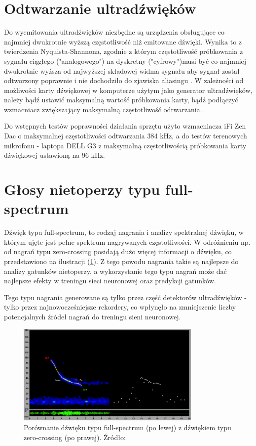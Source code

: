 \documentclass{sprz}
\begin{document}
\section{Odtwarzanie ultradźwięków}
Do wyemitowania ultradźwięków niezbędne są urządzenia obsługujące co najmniej dwukrotnie wyższą częstotliwość niż emitowane dźwięki. Wynika to z twierdzenia Nyquista-Shannona, zgodnie z którym częstotliwość próbkowania z sygnału ciągłego ("analogowego") na dyskretny ("cyfrowy")musi być co najmniej dwukrotnie wyższa od najwyższej składowej widma sygnału aby sygnał został odtworzony poprawnie i nie dochodziło do zjawiska aliasingu \cite{probkowanie}. W zależności od możliwości karty dźwiękowej w komputerze użytym jako generator ultradźwięków, należy bądź ustawić maksymalną wartość próbkowania karty, bądź podłączyć wzmacniacz zwiększający maksymalną częstotliwość odtwarzania.

Do wstępnych testów poprawności działania sprzętu użyto wzmacniacza iFi Zen Dac o maksymalnej częstotliwości odtwarzania 384 kHz, a do testów terenowych mikrofonu - laptopa DELL G3 z maksymalną częstotliwością próbkowania karty dźwiękowej ustawioną na 96 kHz.

\section{Głosy nietoperzy typu full-spectrum}
Dźwięk typu full-spectrum, to rodzaj nagrania i analizy spektralnej dźwięku, w którym ujęte jest pełne spektrum nagrywanych częstotliwości. W odróżnieniu np. od nagrań typu zero-crossing posidają dużo więcej informacji o dźwięku, co przedstawiono na ilustracji (\ref{img:fullspectrum}). Z tego powodu nagrania takie są najlepsze do analizy gatunków nietoperzy, a wykorzystanie tego typu nagrań może dać najlepsze efekty w treningu sieci neuronowej oraz predykcji gatunków.

Tego typu nagrania generowane są tylko przez część detektorów ultradźwięków - tylko przez najnowocześniejsze rekordery, co wpłynęło na zmniejszenie liczby potencjalnych źródeł nagrań do treningu sieni neuronowej.

\begin{figure}[h]
  \centering
  \includegraphics[width=0.8\textwidth]{sprz/fullspectrum.png}
  \caption{Porównanie dźwięku typu full-spectrum (po lewej) z dźwiękiem typu zero-crossing (po prawej). Źródło: \cite{fullspectrum}}
  \label{img:fullspectrum}
\end{figure} 
\end{document}
